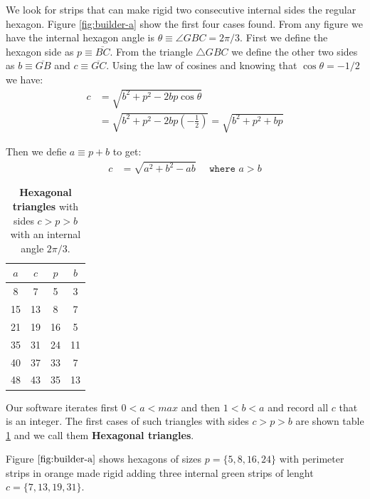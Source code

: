 \documentclass[11pt]{article}
\begin{document}
We look for strips that can make rigid two consecutive internal sides the regular hexagon. Figure \ref{fig:builder-a} show the first four cases found. From any figure we have the internal hexagon angle is $\theta \equiv \angle{GBC} = 2\pi/3$. First we define the hexagon side as $p \equiv \overline{BC}$. From the triangle $\triangle{GBC}$ we define the other two sides as $b \equiv \overline{GB}$ and $c \equiv \overline{GC}$. Using the law of cosines and knowing that $\cos\theta = -1/2$ we have:
\begin{align}
c &= \sqrt{b^2 + p^2 - 2bp\cos\theta} \nonumber\\
 &= \sqrt{b^2 + p^2 - 2bp\left(-\frac{1}{2}\right)}
 = \sqrt{b^2 + p^2 + bp} \label{eq:triplet-cpb}
\end{align}

Then we defie $a \equiv p + b$ to get:
\begin{align}
c &= \sqrt{a^2 + b^2 - ab} \quad \texttt{ where } a > b
\end{align}

\begin{table}[H]
\begin{center}

\begin{tabular}{| c | c c c |}
\hline
$a$ & $c$ & $p$ & $b$ \\ [0.5ex]
\hline\hline
8 & 7 & 5 & 3 \\ \hline
15 & 13 & 8 & 7 \\ \hline
21 & 19 & 16 & 5 \\ \hline
35 & 31 & 24 & 11 \\ \hline
40 & 37 & 33 & 7 \\ \hline
48 & 43 & 35 & 13 \\ \hline
\end{tabular}

\caption{\textbf{Hexagonal triangles} with sides $c > p > b$ with an internal angle $2\pi/3$.}
\label{tbl:triplets}
\end{center}
\end{table}

Our software iterates first $0 < a < max$ and then $1 < b < a$ and record all $c$ that is an integer. The first cases of such triangles with sides $c > p > b$ are shown table \ref{tbl:triplets} and we call them \textbf{Hexagonal triangles}.

Figure $\ref{fig:builder-a}$ shows hexagons of sizes $p = \{5,8,16,24\}$ with perimeter strips in orange made rigid adding three internal green strips of lenght $c = \{7,13,19,31\}$. 
\end{document}
